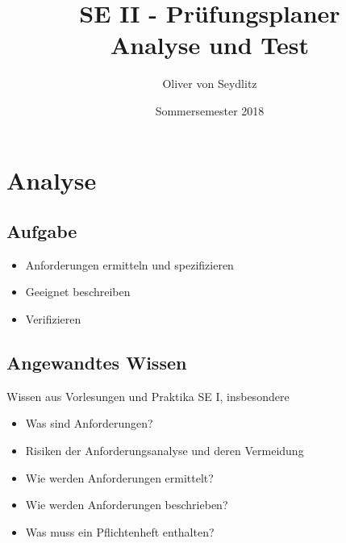 \documentclass{beamer}
\title{SE II - Prüfungsplaner \\ Analyse und Test}
\author{Oliver von Seydlitz}
\date{Sommersemester 2018}
\begin{document}
  \maketitle

  \section{Analyse}
  \subsection{Aufgabe}
  \begin{frame}{\subsecname}
    \begin{itemize}
      \item Anforderungen ermitteln und spezifizieren
      \item Geeignet beschreiben
      \item Verifizieren
    \end{itemize}
  \end{frame}

  \subsection{Angewandtes Wissen}
  \begin{frame}{\subsecname}
    Wissen aus Vorlesungen und Praktika SE I, insbesondere
    \begin{itemize}
      \item Was sind Anforderungen?
      \item Risiken der Anforderungsanalyse und deren Vermeidung
      \item Wie werden Anforderungen ermittelt?
      \item Wie werden Anforderungen beschrieben?
      \item Was muss ein Pflichtenheft enthalten?
    \end{itemize}
  \end{frame}
\end{document}
